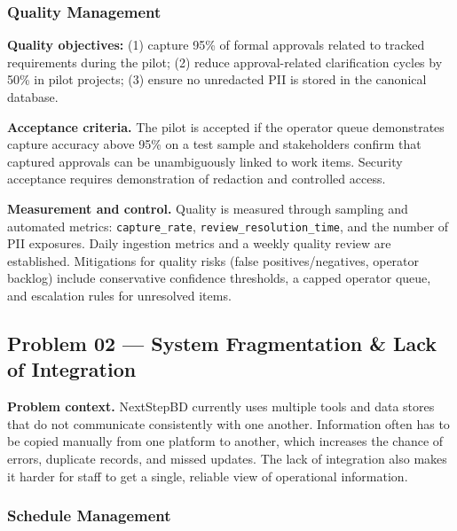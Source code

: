 \documentclass[12pt,a4paper]{report}
\begin{document}
\subsubsection{Quality Management}
\begin{summaryBox}
\textbf{Quality objectives:} (1) capture 95\% of formal approvals related to tracked requirements during the pilot; (2) reduce approval-related clarification cycles by 50\% in pilot projects; (3) ensure no unredacted PII is stored in the canonical database.
\end{summaryBox}

\textbf{Acceptance criteria.} The pilot is accepted if the operator queue demonstrates capture accuracy above 95\% on a test sample and stakeholders confirm that captured approvals can be unambiguously linked to work items. Security acceptance requires demonstration of redaction and controlled access.

\textbf{Measurement and control.} Quality is measured through sampling and automated metrics: \texttt{capture\_rate}, \texttt{review\_resolution\_time}, and the number of PII exposures. Daily ingestion metrics and a weekly quality review are established. Mitigations for quality risks (false positives/negatives, operator backlog) include conservative confidence thresholds, a capped operator queue, and escalation rules for unresolved items.

\subsection{Problem 02 --- System Fragmentation \& Lack of Integration}

\textbf{Problem context.} NextStepBD currently uses multiple tools and data stores that do not communicate consistently with one another. Information often has to be copied manually from one platform to another, which increases the chance of errors, duplicate records, and missed updates. The lack of integration also makes it harder for staff to get a single, reliable view of operational information.

\subsubsection{Schedule Management}
\end{document}
